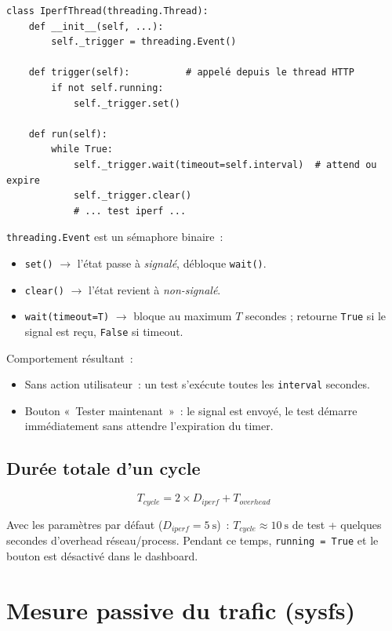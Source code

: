 \documentclass[a4paper,12pt]{article}
\begin{document}
\begin{lstlisting}[caption={Déclenchement via Event}]
class IperfThread(threading.Thread):
    def __init__(self, ...):
        self._trigger = threading.Event()

    def trigger(self):          # appelé depuis le thread HTTP
        if not self.running:
            self._trigger.set()

    def run(self):
        while True:
            self._trigger.wait(timeout=self.interval)  # attend ou expire
            self._trigger.clear()
            # ... test iperf ...
\end{lstlisting}

\texttt{threading.Event} est un sémaphore binaire~:
\begin{itemize}
  \item \texttt{set()} $\to$ l'état passe à \textit{signalé}, débloque \texttt{wait()}.
  \item \texttt{clear()} $\to$ l'état revient à \textit{non-signalé}.
  \item \texttt{wait(timeout=T)} $\to$ bloque au maximum $T$ secondes ; retourne
        \texttt{True} si le signal est reçu, \texttt{False} si timeout.
\end{itemize}

Comportement résultant~:
\begin{itemize}
  \item Sans action utilisateur~: un test s'exécute toutes les \texttt{interval} secondes.
  \item Bouton «~Tester maintenant~»~: le signal est envoyé, le test démarre immédiatement
        sans attendre l'expiration du timer.
\end{itemize}

\subsection{Durée totale d'un cycle}

\begin{equation}
  T_{cycle} = 2 \times D_{iperf} + T_{overhead}
\end{equation}

Avec les paramètres par défaut ($D_{iperf} = 5\ \text{s}$)~:
$T_{cycle} \approx 10\ \text{s}$ de test + quelques secondes d'overhead réseau/process.
Pendant ce temps, \texttt{running = True} et le bouton est désactivé dans le dashboard.

\section{Mesure passive du trafic (sysfs)}
\end{document}

